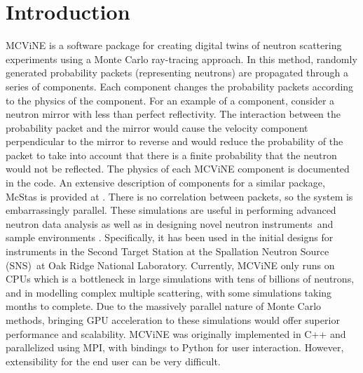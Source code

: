 

\section{Introduction}

MCViNE\cite{lin2016mcvine,Lin_2019} is a software package for creating digital twins of neutron scattering experiments using a Monte Carlo ray-tracing approach. 
In this method, randomly generated probability packets (representing neutrons) are propagated through a series of components. 
Each component changes the probability packets according to the physics of the component.
For an example of a component, consider a neutron mirror with less than perfect reflectivity. The interaction between the  probability packet and the mirror would cause the velocity component perpendicular to the mirror to reverse and would reduce the probability of the packet to take into account that there is a finite probability that the neutron would not be reflected. The physics of each MCViNE component is documented in the code.
An extensive description of components for a similar package, McStas is provided at \cite{willendrup_components}.
There is no correlation between packets, so the system is embarrassingly parallel.
These simulations are useful in performing advanced neutron data analysis \cite{lin2022super,islam2019super,sala2022ferrimagnetic,do2022damped,leiner2019frustrated,lin2014UN} as well as in designing novel neutron instruments\,\cite{mamontov2022bwaves,an2022menus,sala2022chess,garlea2022verdi,leighton2022ewald,liu2022pioneer,qian2022centaur,changwoo2022expanse,ankner2023cinematic,hassina2023cupi2d,linjiao2023guide_misalignment} and sample environments \cite{stone2019design,niedziela2017design}. Specifically, it has been used in the initial designs for instruments in the Second Target Station at the Spallation Neutron Source (SNS)\,\cite{mason2006spallation} at Oak Ridge National Laboratory. 
Currently, MCViNE only runs on CPUs which is a bottleneck in large simulations with tens of billions of neutrons, and in modelling complex multiple scattering, with some simulations taking months to complete. Due to the massively parallel nature of Monte Carlo methods, bringing GPU acceleration to these simulations would offer superior performance and scalability. MCViNE was originally implemented in C++ and parallelized using MPI, with bindings to Python for user interaction. 
However, extensibility for the end user can be very difficult.

